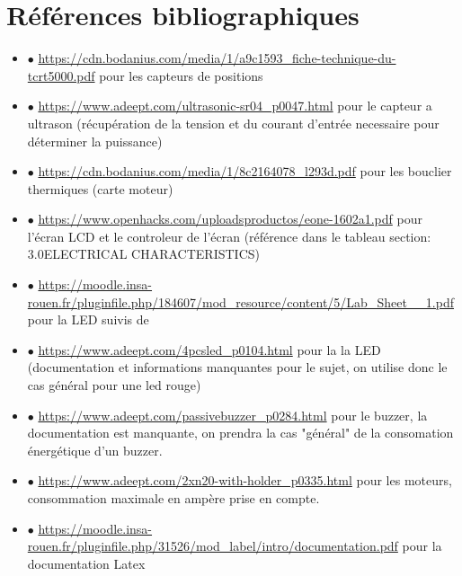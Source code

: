 \section{Références bibliographiques}


    \begin{itemize}
        \item $\bullet$ \url{https://cdn.bodanius.com/media/1/a9c1593_fiche-technique-du-tcrt5000.pdf} pour les capteurs de positions 
        \item $\bullet$ \url{https://www.adeept.com/ultrasonic-sr04_p0047.html} pour le capteur a ultrason (récupération de la tension et du courant d'entrée necessaire pour déterminer la puissance)
        \item $\bullet$ \url{https://cdn.bodanius.com/media/1/8c2164078_l293d.pdf} pour les bouclier thermiques (carte moteur)
        \item $\bullet$ \url{https://www.openhacks.com/uploadsproductos/eone-1602a1.pdf} pour l'écran LCD et le controleur de l'écran (référence dans le tableau section: 3.0ELECTRICAL CHARACTERISTICS)
        \item $\bullet$ \url{https://moodle.insa-rouen.fr/pluginfile.php/184607/mod_resource/content/5/Lab_Sheet__1.pdf} pour la LED suivis de 
        \item $\bullet$ \url{https://www.adeept.com/4pcsled_p0104.html} pour la la LED (documentation et informations manquantes pour le sujet, on utilise donc le cas général pour une led rouge)
        \item $\bullet$ \url{https://www.adeept.com/passivebuzzer_p0284.html} pour le buzzer, la documentation est manquante, on prendra la cas "général" de la consomation énergétique d'un buzzer. 
        \item $\bullet$ \url{https://www.adeept.com/2xn20-with-holder_p0335.html} pour les moteurs, consommation maximale en ampère prise en compte.         
        \item $\bullet$ \url{https://moodle.insa-rouen.fr/pluginfile.php/31526/mod_label/intro/documentation.pdf} pour la documentation Latex
        
    \end{itemize}
